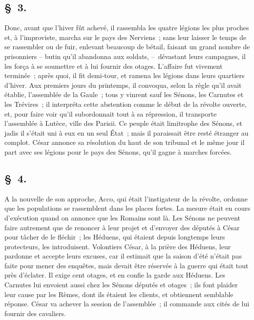 \documentclass[french,twoside]{book} %
\begin{document}
\subsection[{§ 3.}]{ \textsc{§ 3.} }
\noindent Donc, avant que l’hiver fût achevé, il rassembla les quatre légions les plus proches et, à l’improviste, marcha sur le pays des Nerviens ; sans leur laisser le temps de se rassembler ou de fuir, enlevant beaucoup de bétail, faisant un grand nombre de prisonniers – butin qu’il abandonna aux soldats, – dévastant leurs campagnes, il les força à se soumettre et à lui fournir des otages. L'affaire fut vivement terminée ; après quoi, il fit demi-tour, et ramena les légions dans leurs quartiers d’hiver. Aux premiers jours du printemps, il convoqua, selon la règle qu’il avait établie, l’assemblée de la Gaule ; tous y vinrent sauf les Sénons, les Carnutes et les Trévires ; il interpréta cette abstention comme le début de la révolte ouverte, et, pour faire voir qu’il subordonnait tout à sa répression, il transporte l’assemblée à Lutèce, ville des Parisii. Ce peuple était limitrophe des Sénons, et jadis il s’était uni à eux en un seul État ; mais il paraissait être resté étranger au complot. César annonce sa résolution du haut de son tribunal et le même jour il part avec ses légions pour le pays des Sénons, qu’il gagne à marches forcées.
\subsection[{§ 4.}]{ \textsc{§ 4.} }
\noindent A la nouvelle de son approche, Acco, qui était l’instigateur de la révolte, ordonne que les populations se rassemblent dans les places fortes. La mesure était en cours d’exécution quand on annonce que les Romains sont là. Les Sénons ne peuvent faire autrement que de renoncer à leur projet et d’envoyer des députés à César pour tâcher de le fléchir ; les Héduens, qui étaient depuis longtemps leurs protecteurs, les introduisent. Volontiers César, à la prière des Héduens, leur pardonne et accepte leurs excuses, car il estimait que la saison d’été n’était pas faite pour mener des enquêtes, mais devait être réservée à la guerre qui était tout près d’éclater. Il exige cent otages, et en confie la garde aux Héduens. Les Carnutes lui envoient aussi chez les Sénons députés et otages ; ils font plaider leur cause par les Rèmes, dont ils étaient les clients, et obtiennent semblable réponse. César va achever la session de l’assemblée ; il commande aux cités de lui fournir des cavaliers.
\end{document}
